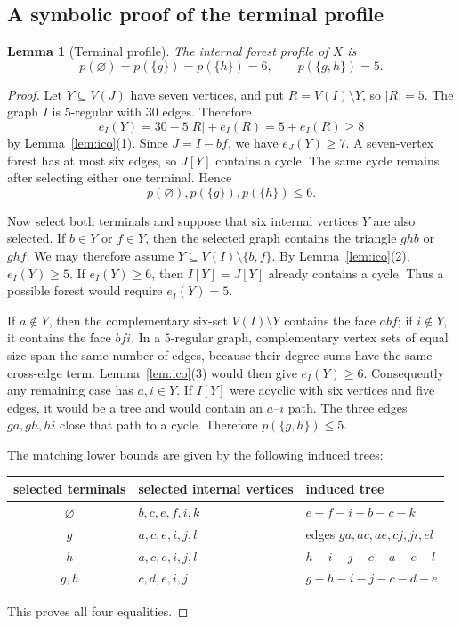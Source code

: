 \documentclass[11pt]{article}
\newtheorem{lemma}[theorem]{Lemma}
\theoremstyle{definition}
\theoremstyle{remark}
\begin{document}
\subsection{A symbolic proof of the terminal profile}

\begin{lemma}[Terminal profile]\label{lem:profile}
The internal forest profile of $X$ is
\[
 \boxed{
 p(\varnothing)=p(\{g\})=p(\{h\})=6,
 \qquad
 p(\{g,h\})=5.}
\]
\end{lemma}

\begin{proof}
Let $Y\subseteq V(J)$ have seven vertices, and put
$R=V(I)\setminus Y$, so $|R|=5$.  The graph $I$ is $5$-regular with
$30$ edges.  Therefore
\[
 e_I(Y)=30-5|R|+e_I(R)=5+e_I(R)\ge8
\]
by Lemma~\ref{lem:ico}(1).  Since $J=I-bf$, we have $e_J(Y)\ge7$.
A seven-vertex forest has at most six edges, so $J[Y]$ contains a cycle.
The same cycle remains after selecting either one terminal.  Hence
\[
 p(\varnothing),p(\{g\}),p(\{h\})\le6.
\]

Now select both terminals and suppose that six internal vertices $Y$ are
also selected.  If $b\in Y$ or $f\in Y$, then the selected graph contains
the triangle $ghb$ or $ghf$.  We may therefore assume
$Y\subseteq V(I)\setminus\{b,f\}$.  By Lemma~\ref{lem:ico}(2),
$e_I(Y)\ge5$.  If $e_I(Y)\ge6$, then $I[Y]=J[Y]$ already contains a cycle.
Thus a possible forest would require $e_I(Y)=5$.

If $a\notin Y$, then the complementary six-set $V(I)\setminus Y$ contains
the face $abf$; if $i\notin Y$, it contains the face $bfi$.  In a
$5$-regular graph, complementary vertex sets of equal size span the same
number of edges, because their degree sums have the same cross-edge term.
Lemma~\ref{lem:ico}(3) would then give $e_I(Y)\ge6$.  Consequently any
remaining case has $a,i\in Y$.  If $I[Y]$ were acyclic with six vertices and
five edges, it would be a tree and would contain an $a$--$i$ path.  The
three edges $ga,gh,hi$ close that path to a cycle.  Therefore
$p(\{g,h\})\le5$.

The matching lower bounds are given by the following induced trees:
\begin{center}
\begin{tabular}{c@{\qquad}l@{\qquad}l}
\toprule
selected terminals & selected internal vertices & induced tree\\
\midrule
$\varnothing$ & $b,c,e,f,i,k$ & $e-f-i-b-c-k$\\
$g$ & $a,c,e,i,j,l$ & edges $ga,ac,ae,cj,ji,el$\\
$h$ & $a,c,e,i,j,l$ & $h-i-j-c-a-e-l$\\
$g,h$ & $c,d,e,i,j$ & $g-h-i-j-c-d-e$\\
\bottomrule
\end{tabular}
\end{center}
This proves all four equalities.
\end{proof}
\end{document}
